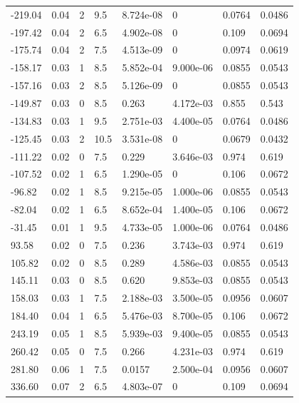 \documentclass[preview]{standalone}
\begin{document}
{{\begin{tabular}{L{1.2cm}C{1.2cm} C{0.3cm}C{0.5cm} C{1.4cm}C{1.4cm} C{1.4cm}C{1.4cm}}
  -219.04  &  0.04  & 2     & 9.5 &  8.724e-08  & 0  & 0.0764 &  0.0486   \\ 
  -197.42  &  0.04  & 2     & 6.5 &  4.902e-08  & 0  & 0.109 &  0.0694   \\ 
  -175.74  &  0.04  & 2     & 7.5 &  4.513e-09  & 0  & 0.0974 &  0.0619   \\ 
  -158.17  &  0.03  & 1     & 8.5 &  5.852e-04  & 9.000e-06  & 0.0855 &  0.0543   \\ 
  -157.16  &  0.03  & 2     & 8.5 &  5.126e-09  & 0  & 0.0855 &  0.0543   \\ 
  -149.87  &  0.03  & 0     & 8.5 &  0.263  & 4.172e-03  & 0.855 &  0.543   \\ 
  -134.83  &  0.03  & 1     & 9.5 &  2.751e-03  & 4.400e-05  & 0.0764 &  0.0486   \\ 
  -125.45  &  0.03  & 2     & 10.5 &  3.531e-08  & 0  & 0.0679 &  0.0432   \\ 
  -111.22  &  0.02  & 0     & 7.5 &  0.229  & 3.646e-03  & 0.974 &  0.619   \\ 
  -107.52  &  0.02  & 1     & 6.5 &  1.290e-05  & 0  & 0.106 &  0.0672   \\ 
  -96.82  &  0.02  & 1     & 8.5 &  9.215e-05  & 1.000e-06  & 0.0855 &  0.0543   \\ 
  -82.04  &  0.02  & 1     & 6.5 &  8.652e-04  & 1.400e-05  & 0.106 &  0.0672   \\ 
  -31.45  &  0.01  & 1     & 9.5 &  4.733e-05  & 1.000e-06  & 0.0764 &  0.0486   \\ 
  93.58  &  0.02  & 0     & 7.5 &  0.236  & 3.743e-03  & 0.974 &  0.619   \\ 
  105.82  &  0.02  & 0     & 8.5 &  0.289  & 4.586e-03  & 0.0855 &  0.0543   \\ 
  145.11  &  0.03  & 0     & 8.5 &  0.620  & 9.853e-03  & 0.0855 &  0.0543   \\ 
  158.03  &  0.03  & 1     & 7.5 &  2.188e-03  & 3.500e-05  & 0.0956 &  0.0607   \\ 
  184.40  &  0.04  & 1     & 6.5 &  5.476e-03  & 8.700e-05  & 0.106 &  0.0672   \\ 
  243.19  &  0.05  & 1     & 8.5 &  5.939e-03  & 9.400e-05  & 0.0855 &  0.0543   \\ 
  260.42  &  0.05  & 0     & 7.5 &  0.266  & 4.231e-03  & 0.974 &  0.619   \\ 
  281.80  &  0.06  & 1     & 7.5 &  0.0157  & 2.500e-04  & 0.0956 &  0.0607   \\ 
  336.60  &  0.07  & 2     & 6.5 &  4.803e-07  & 0  & 0.109 &  0.0694   \\ 

\end{tabular}}}
\end{document}
